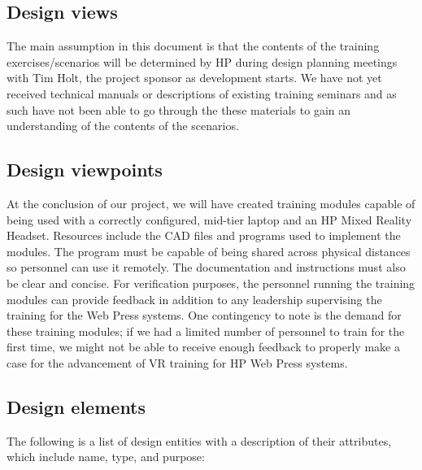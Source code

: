 \documentclass[onecolumn, draftclsnofoot,10pt, compsoc]{IEEEtran}
\begin{document}
\subsection{Design views}
The main assumption in this document is that the contents of the training exercises/scenarios will be determined by HP during design planning meetings with Tim Holt, the project sponsor as development starts. We have not yet received technical manuals or descriptions of existing training seminars and as such have not been able to go through the these materials to gain an understanding of the contents of the scenarios.
\subsection{Design viewpoints}
At the conclusion of our project, we will have created training modules capable of being used with a correctly configured, mid-tier laptop and an HP Mixed Reality Headset. Resources include the CAD files and programs used to implement the modules. The program must be capable of being shared across physical distances so personnel can use it remotely. The documentation and instructions must also be clear and concise. For verification purposes, the personnel running the training modules can provide feedback in addition to any leadership supervising the training for the Web Press systems. One contingency to note is the demand for these training modules; if we had a limited number of personnel to train for the first time, we might not be able to receive enough feedback to properly make a case for the advancement of VR training for HP Web Press systems. 
\newpage

\subsection{Design elements}
The following is a list of design entities with a description of their attributes, which include name, type, and purpose:
\end{document}
